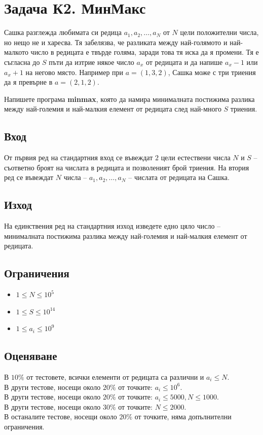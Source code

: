 \documentclass[12pt]{article}
\begin{document}
\section{Задача К2. МинМакс}

Сашка разглежда любимата си редица $a_1, a_2, \dots, a_N$ от $N$ цели положителни
числа, но нещо не и харесва. Тя забелязва, че разликата между най-голямото и най-малкото число в редицата е твърде голяма, заради това тя иска да я промени. Тя е съгласна до $S$ пъти да изтрие някое число $a_x$ от редицата и да напише $a_x - 1$ или
$a_x + 1$ на негово място. Например при $a = (1, 3, 2)$, Сашка може с три триения да я
превърне в $a = (2, 1, 2)$.

Напишете програма \textbf{minmax}, която да намира минималната постижима разлика между най-големия и най-малкия елемент от редицата след най-много $S$ триения.

\subsection{Вход}
От първия ред на стандартния вход се въвеждат $2$ цели естествени числа $N$ и $S$ -- съответно броят на числата в редицата и позволеният брой триения. На втория ред се въвеждат $N$ числа -- $a_1, a_2, \dots, a_N$ -- числата от редицата на Сашка.

\subsection{Изход}
На единствения ред на стандартния изход изведете едно цяло число -- минималната постижима разлика между
най-големия и най-малкия елемент от редицата.


\subsection{Ограничения}
\vspace{0.1em}
\begin{itemize}
	\item $1 \leq N \leq 10^5$
	\item $1 \leq S\leq 10^{14}$
    \item $1 \leq a_i \leq 10 ^9$
\end{itemize}

\subsection{Оценяване}
\noindent В $10\%$ от тестовете, всички елементи от редицата са различни и $a_i \leq N$. \\
В други тестове, носещи около $20\%$ от точките: $a_i \leq 10^6$.\\
В други тестове, носещи около $20\%$ от точките: $a_i \leq 5000, N \leq 1000$.\\
В други тестове, носещи около $30\%$ от точките: $N \leq 2000$.\\
В останалите тестове, носещи около $20\%$ от точките, няма допълнителни
ограничения.
\end{document}
